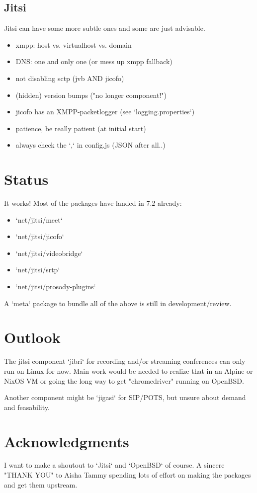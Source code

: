\documentclass[conference]{IEEEtran}
\begin{document}
\subsection{Jitsi}
Jitsi can have some more subtle ones and some are just advisable.
\begin{itemize}
\item xmpp: host vs. virtualhost vs. domain
\item DNS: one and only one (or mess up xmpp fallback)
\item not disabling sctp (jvb AND jicofo)
\item (hidden) version bumps ("no longer component!")
\item jicofo has an XMPP-packetlogger (see `logging.properties`)
\item patience, be really patient (at initial start)
\item always check the `,` in config.js (JSON after all..)
\end{itemize}
\section{Status}
It works! Most of the packages have landed in 7.2 already:
\begin{itemize}
\item `net/jitsi/meet`
\item `net/jitsi/jicofo`
\item `net/jitsi/videobridge`
\item `net/jitsi/srtp`
\item `net/jitsi/prosody-plugins`
\end{itemize}
A `meta` package to bundle all of the above is still in development/review.

\section{Outlook}
The jitsi component `jibri` for recording and/or streaming conferences can only run
on Linux for now. Main work would be needed to realize that in an Alpine or NixOS VM or
going the long way to get "chromedriver" running on OpenBSD.

Another component might be `jigasi` for SIP/POTS, but unsure about demand and feasability.

\section{Acknowledgments}
I want to make a shoutout to `Jitsi` and `OpenBSD` of course. A sincere "THANK YOU" to
Aisha Tammy spending lots of effort on making the packages and get them upstream.
\end{document}
